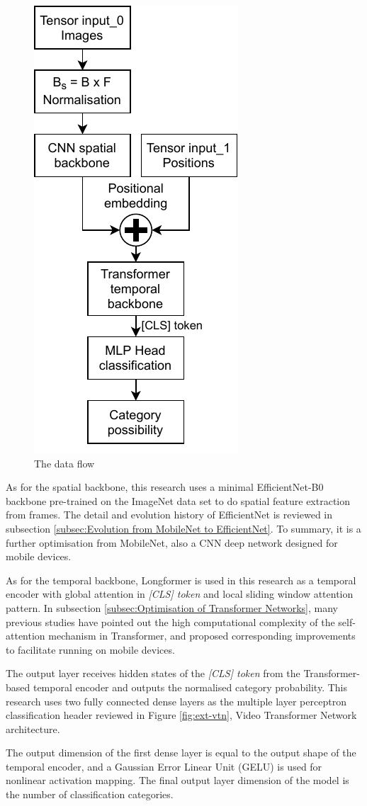 \begin{figure}
    \vspace*{-1.2em}
    \centering
    \includegraphics[width=.32\textwidth]{design/imgs/3-model-dataflow.pdf}
    \caption{The data flow}
    \label{fig:3-model-dataflow}
\end{figure}

As for the spatial backbone, this research uses a minimal EfficientNet-B0 backbone pre-trained on the ImageNet data set to do spatial feature extraction from frames.
The detail and evolution history of EfficientNet is reviewed in subsection  \ref{subsec:Evolution from MobileNet to EfficientNet}.
To summary, it is a further optimisation from MobileNet, also a CNN deep network designed for mobile devices.

As for the temporal backbone, Longformer is used in this research as a temporal encoder with global attention in \textit{[CLS] token} and local sliding window attention pattern.
In subsection \ref{subsec:Optimisation of Transformer Networks}, many previous studies have pointed out the high computational complexity of the self-attention mechanism in Transformer, and proposed corresponding improvements to facilitate running on mobile devices.

The output layer receives hidden states of the \textit{[CLS] token} from the Transformer-based temporal encoder and outputs the normalised category probability.
This research uses two fully connected dense layers as the multiple layer perceptron classification header reviewed in Figure \ref{fig:ext-vtn}, Video Transformer Network architecture.

The output dimension of the first dense layer is equal to the output shape of the temporal encoder, and a Gaussian Error Linear Unit (GELU) is used for nonlinear activation mapping.
The final output layer dimension of the model is the number of classification categories.

